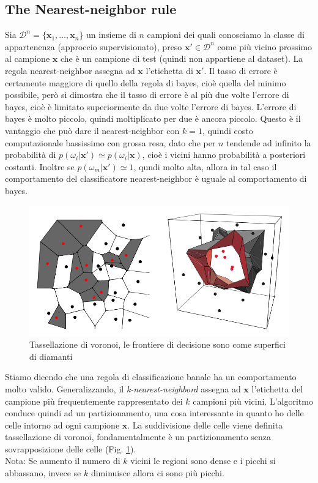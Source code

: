 \subsection{The Nearest-neighbor rule}
Sia $\mathcal{D}^n = \{\mathbf{x}_1, \dots, \mathbf{x}_n \}$ un insieme di $n$ campioni dei quali conosciamo la classe di appartenenza (approccio supervisionato), preso $\mathbf{x}' \in \mathcal{D}^n$ come più vicino prossimo al campione $\mathbf{x}$ che è un campione di test (quindi non appartiene al dataset). La regola nearest-neighbor assegna ad $\mathbf{x}$ l'etichetta di $\mathbf{x}'$. Il tasso di errore è certamente maggiore di quello della regola di bayes, cioè quella del minimo possibile, però si dimostra che il tasso di errore è al più due volte l'errore di bayes, cioè è limitato superiormente da due volte l'errore di bayes. L'errore di bayes è molto piccolo, quindi moltiplicato per due è ancora piccolo. Questo è il vantaggio che può dare il nearest-neighbor con $k=1$, quindi costo computazionale bassissimo con grossa resa, dato che per $n$ tendende ad infinito la probabilità di $p(\omega_i|\mathbf{x}') \simeq p(\omega_i|\mathbf{x})$, cioè i vicini hanno probabilità a posteriori costanti. Inoltre se $p(\omega_m|\mathbf{x}') \simeq 1$, qundi molto alta, allora in tal caso il comportamento del classificatore nearest-neighbor è uguale al comportamento di bayes. 
\begin{figure}
\centering
\includegraphics[scale=0.4]{img/voronoi.png}
\caption{Tassellazione di voronoi, le frontiere di decisione sono come superfici di diamanti}
\label{voronoi}
\end{figure}
Stiamo dicendo che una regola di classificazione banale ha un comportamento molto valido. Generalizzando, il \emph{k-nearest-neighbord} assegna ad $\mathbf{x}$ l'etichetta del campione più frequentemente rappresentato dei $k$ campioni più vicini. L'algoritmo conduce quindi ad un partizionamento, una cosa interessante in quanto ho delle celle intorno ad ogni campione $\mathbf{x}$. La suddivisione delle celle viene definita tassellazione di voronoi, fondamentalmente è un partizionamento senza sovrapposizione delle celle (Fig. \ref{voronoi}). \\

\noindent Nota: Se aumento il numero di $k$ vicini le regioni sono dense e i picchi si abbassano, invece se $k$ diminuisce allora ci sono più picchi.


%
